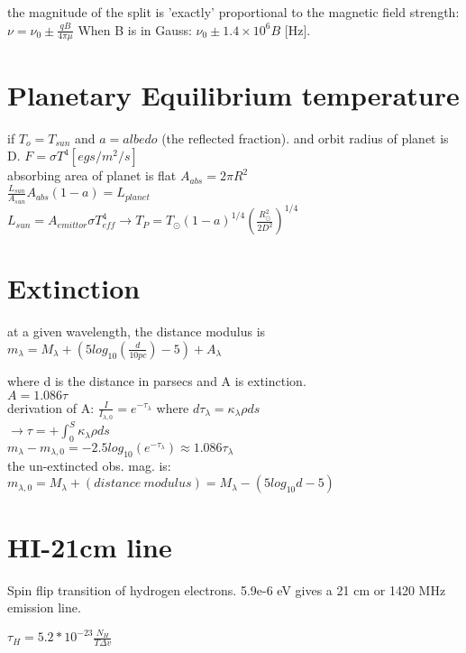 the magnitude of the split is 'exactly' proportional to the magnetic field strength: \(\boxed{\nu=\nu_0\pm \frac{qB}{4\pi\mu}}\)
When B is in Gauss: \({\nu_0\pm1.4\times10^6B }\) [Hz].  




\section{Planetary Equilibrium temperature}
if $T_o=T_{sun}$ and $a=albedo$ (the reflected fraction). and orbit radius of planet is D. $F=\sigma T^4 [egs/m^2/s]$\\
absorbing area of planet is flat $A_{abs}=2\pi R^2$\\ 
$\frac{L_{sun}}{A_{sun}}A_{abs}(1-a)=L_{planet}$\\
$L_{sun}=A_{emittor}\sigma T_{eff}^4 \rightarrow T_P=T_\odot(1-a)^{1/4}(\frac{R_\odot^2}{2D^2})^{1/4}$\\



\section{Extinction}
at a given wavelength, the distance modulus is 
\(m_\lambda=M_\lambda+(5log_{10}(\frac{d}{10pc})-5)+A_\lambda\)

where d is the distance in parsecs and A is extinction.\\
$A=1.086\tau$\\
derivation of A: $\frac{I}{I_{\lambda,0}}=e^{-\tau_\lambda}$ where $d\tau_\lambda=\kappa_\lambda\rho ds$\\
$\rightarrow \tau=+\int_0^S\kappa_\lambda\rho ds$\\
$m_\lambda-m_{\lambda, 0}=-2.5log_{10}(e^{-\tau_\lambda})\approx 1.086\tau_\lambda$\\
the un-extincted obs. mag. is: $m_{\lambda, 0}=M_\lambda+(distance \ modulus)=M_\lambda-(5log_{10}d-5)$



\section{HI-21cm line}
Spin flip transition of hydrogen electrons. 5.9e-6 eV gives a 21 cm or 1420 MHz emission line.
 
$\tau_H=5.2*10^{-23} \frac{N_H}{T\Delta v}$\\

